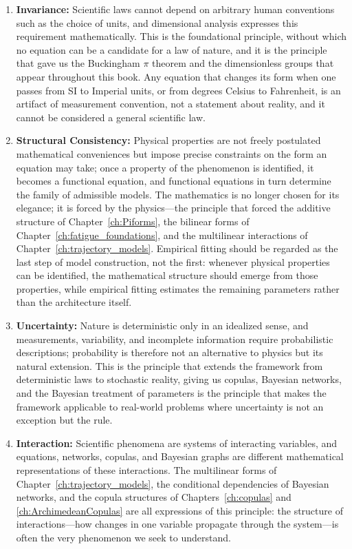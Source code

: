 \begin{enumerate}

\item \textbf{Invariance:} Scientific laws cannot depend on arbitrary human conventions such as the choice of units, and dimensional analysis expresses this requirement mathematically. This is the foundational principle, without which no equation can be a candidate for a law of nature, and it is the principle that gave us the Buckingham \(\pi\) theorem and the dimensionless groups that appear throughout this book. Any equation that changes its form when one passes from SI to Imperial units, or from degrees Celsius to Fahrenheit, is an artifact of measurement convention, not a statement about reality, and it cannot be considered a general scientific law.

\item \textbf{Structural Consistency:} Physical properties are not freely postulated mathematical conveniences but impose precise constraints on the form an equation may take; once a property of the phenomenon is identified, it becomes a functional equation, and functional equations in turn determine the family of admissible models. The mathematics is no longer chosen for its elegance; it is forced by the physics—the principle that forced the additive structure of Chapter~\ref{ch:Piforms}, the bilinear forms of Chapter~\ref{ch:fatigue_foundations}, and the multilinear interactions of Chapter~\ref{ch:trajectory_models}. Empirical fitting should be regarded as the last step of model construction, not the first: whenever physical properties can be identified, the mathematical structure should emerge from those properties, while empirical fitting estimates the remaining parameters rather than the architecture itself.

\item \textbf{Uncertainty:} Nature is deterministic only in an idealized sense, and measurements, variability, and incomplete information require probabilistic descriptions; probability is therefore not an alternative to physics but its natural extension. This is the principle that extends the framework from deterministic laws to stochastic reality, giving us copulas, Bayesian networks, and the Bayesian treatment of parameters is the principle that makes the framework applicable to real-world problems where uncertainty is not an exception but the rule.

\item \textbf{Interaction:} Scientific phenomena are systems of interacting variables, and equations, networks, copulas, and Bayesian graphs are different mathematical representations of these interactions. The multilinear forms of Chapter~\ref{ch:trajectory_models}, the conditional dependencies of Bayesian networks, and the copula structures of Chapters~\ref{ch:copulas} and \ref{ch:ArchimedeanCopulas} are all expressions of this principle: the structure of interactions—how changes in one variable propagate through the system—is often the very phenomenon we seek to understand.

\end{enumerate}

